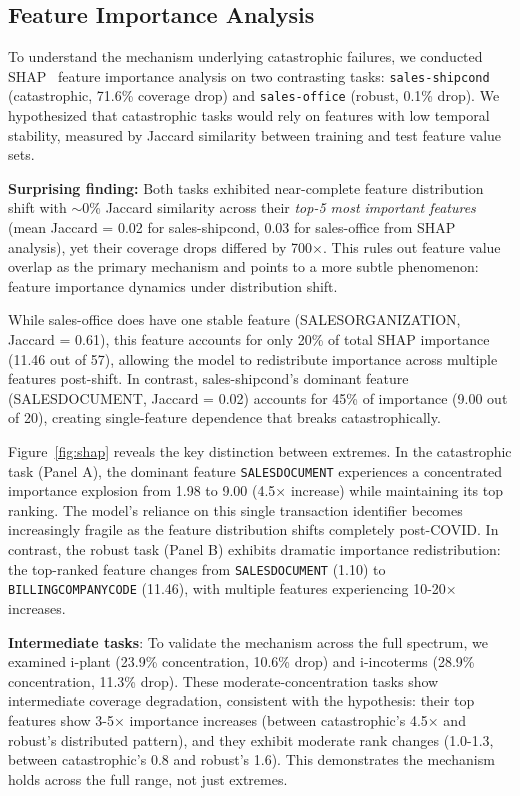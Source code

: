 \documentclass[sigconf]{acmart}
\begin{document}
\subsection{Feature Importance Analysis}

To understand the mechanism underlying catastrophic failures, we conducted SHAP~\cite{lundberg2017unified} feature importance analysis on two contrasting tasks: \texttt{sales-shipcond} (catastrophic, 71.6\% coverage drop) and \texttt{sales-office} (robust, 0.1\% drop). We hypothesized that catastrophic tasks would rely on features with low temporal stability, measured by Jaccard similarity between training and test feature value sets.

\textbf{Surprising finding:} Both tasks exhibited near-complete feature
distribution shift with $\sim$0\% Jaccard similarity across their
\textit{top-5 most important features} (mean Jaccard = 0.02 for sales-shipcond,
0.03 for sales-office from SHAP analysis), yet their coverage drops differed
by 700$\times$. This rules out feature value overlap as the primary mechanism
and points to a more subtle phenomenon: feature importance dynamics under
distribution shift.

While sales-office does have one stable feature (SALESORGANIZATION, Jaccard = 0.61),
this feature accounts for only 20\% of total SHAP importance (11.46 out of 57),
allowing the model to redistribute importance across multiple features post-shift.
In contrast, sales-shipcond's dominant feature (SALESDOCUMENT, Jaccard = 0.02)
accounts for 45\% of importance (9.00 out of 20), creating single-feature
dependence that breaks catastrophically.

Figure~\ref{fig:shap} reveals the key distinction between extremes. In the catastrophic task (Panel A), the dominant feature \texttt{SALESDOCUMENT} experiences a concentrated importance explosion from 1.98 to 9.00 (4.5× increase) while maintaining its top ranking. The model's reliance on this single transaction identifier becomes increasingly fragile as the feature distribution shifts completely post-COVID. In contrast, the robust task (Panel B) exhibits dramatic importance redistribution: the top-ranked feature changes from \texttt{SALESDOCUMENT} (1.10) to \texttt{BILLINGCOMPANYCODE} (11.46), with multiple features experiencing 10-20× increases.

\textbf{Intermediate tasks}: To validate the mechanism across the full spectrum, we examined i-plant (23.9\% concentration, 10.6\% drop) and i-incoterms (28.9\% concentration, 11.3\% drop). These moderate-concentration tasks show intermediate coverage degradation, consistent with the hypothesis: their top features show 3-5× importance increases (between catastrophic's 4.5× and robust's distributed pattern), and they exhibit moderate rank changes (1.0-1.3, between catastrophic's 0.8 and robust's 1.6). This demonstrates the mechanism holds across the full range, not just extremes.
\end{document}
